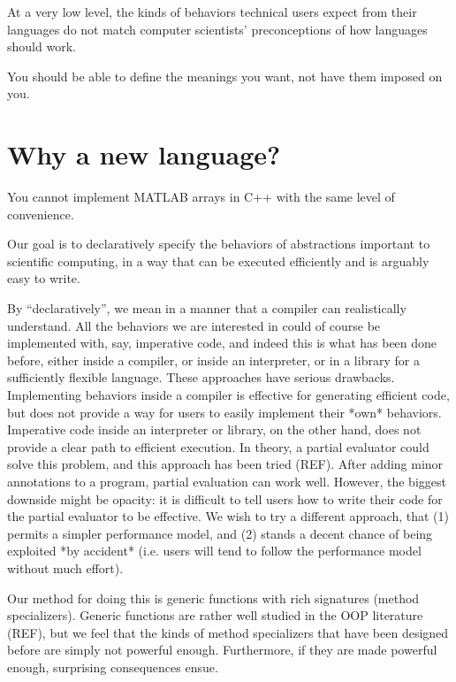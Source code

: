 At a very low level, the kinds of behaviors technical users expect
from their languages do not match computer scientists' preconceptions
of how languages should work.

You should be able to define the meanings you want, not have them
imposed on you.


\section{Why a new language?}

You cannot implement MATLAB arrays in C++ with the same level of
convenience.


Our goal is to declaratively specify the behaviors of abstractions
important to scientific computing, in a way that can be executed
efficiently and is arguably easy to write.

By ``declaratively'', we mean in a manner that a compiler can
realistically understand. All the behaviors we are interested in
could of course be implemented with, say, imperative code, and indeed
this is what has been done before, either inside a compiler, or inside
an interpreter, or in a library for a sufficiently flexible language.
These approaches have serious drawbacks. Implementing behaviors
inside a compiler is effective for generating efficient code, but
does not provide a way for users to easily implement their *own*
behaviors. Imperative code inside an interpreter or library, on the other hand,
does not provide a clear path to efficient execution. In theory, a
partial evaluator could solve this problem, and this approach has been
tried (REF). After adding minor annotations to a program, partial evaluation
can work well. However, the biggest downside might be opacity: it is
difficult to tell users how to write their code for the partial
evaluator to be effective. We wish to try a different approach, that
(1) permits a simpler performance model, and (2) stands a decent chance
of being exploited *by accident* (i.e. users will tend to follow the performance
model without much effort).


Our method for doing this is generic functions with rich signatures
(method specializers). Generic functions are rather well studied in the
OOP literature (REF), but we feel that the kinds of method specializers
that have been designed before are simply not powerful enough.
Furthermore, if they are made powerful enough, surprising consequences
ensue.




